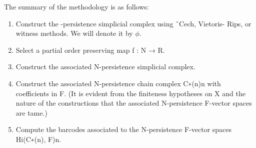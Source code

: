 \documentclass[11pt,reqno,oneside,a4paper]{article}
\begin{document}
The summary of the methodology is as follows:
\begin{enumerate}
	\item Construct the -persistence simplicial complex using ˇCech, Vietoris-
	Rips, or witness methods. We will denote it by $\phi$.
	\item Select a partial order preserving map f : N → R.
	\item Construct the associated N-persistence simplicial complex.
	\item Construct the associated N-persistence chain complex {C∗(n)}n with coefficients
	in F. (It is evident from the finiteness hypotheses on X and
	the nature of the constructions that the associated N-persistence F-vector
	spaces are tame.)
	\item Compute the barcodes associated to the N-persistence F-vector spaces
	{Hi(C∗(n), F)}n.
\end{enumerate}




{\small}
\end{document}
